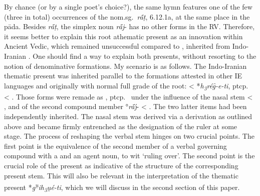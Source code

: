 \documentclass[output=paper,colorlinks,citecolor=brown]{langscibook}
\begin{document}
By chance (or by a single poet’s choice?), the same hymn features one of the few (three in total) occurrences of the nom.sg.\ \textit{rā́ṭ}, 6.12.1a, at the same place in the pāda. Besides \textit{rā́ṭ}, the simplex noun \textit{rā́j}-  has no other forms in the RV. Therefore, it seems better to explain this root athematic present  as an innovation within Ancient Vedic, which remained unsuccessful compared to , inherited from Indo-Iranian . One should find a way to explain both presents, without resorting to the notion of denominative formations. My scenario is as follows.  The Indo-Iranian thematic present was inherited parallel to the formations attested in other IE languages and originally with normal full grade of the root:  < *\textit{h\textsubscript{3}rég̑-e-ti}, ptcp.\   < . Those forms were remade as , ptcp.\   under the influence of the nasal stem  < , and of the second compound member  °\textit{rā́ȷ́}- < . The two latter items had been independently inherited. The nasal stem was derived via a  derivation as outlined above and became firmly entrenched as the designation of the ruler at some stage. The process of reshaping the verbal stem hinges on two crucial points. The first point is the equivalence of the second member of a verbal governing compound  with a  and an agent noun, to wit ‘ruling over’. The second point is the crucial role of the present  as indicative of the structure of the corresponding present stem. This will also be relevant in the interpretation of the thematic present  *\textit{g\textsuperscript{u̯}ih\textsubscript{3}u̯é-ti}, which we will discuss in the second section of this paper. 
\end{document}
